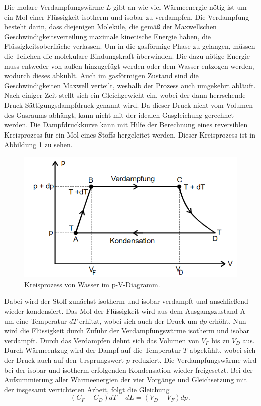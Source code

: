 Die molare Verdampfungswärme $L$ gibt an wie viel Wärmeenergie nötig ist um ein Mol einer Flüssigkeit isotherm und isobar zu verdampfen. 
Die Verdampfung besteht darin, dass diejenigen Moleküle, die gemäß der Maxwellschen Geschwindigkeitsverteilung maximale kinetische Energie haben, die Flüssigkeitsoberfläche verlassen.
Um in die gasförmige Phase zu gelangen, müssen die Teilchen die molekulare Bindungskraft überwinden. Die dazu nötige Energie muss entweder von außen hinzugefügt werden oder dem Wasser entzogen werden, wodurch dieses abkühlt.
Auch im gasförmigen Zustand sind die Geschwindigkeiten Maxwell verteilt, weshalb der Prozess auch umgekehrt abläuft. Nach einiger Zeit stellt sich ein Gleichgewicht ein, wobei der dann herrschende Druck 
Sättigungsdampfdruck genannt wird. Da dieser Druck nicht vom Volumen des Gasraums abhängt, kann nicht mit der idealen Gasgleichung gerechnet werden.
Die Dampfdruckkurve kann mit Hilfe der Berechnung eines reversiblen Kreisprozess für ein Mol eines Stoffs hergeleitet werden. Dieser Kreisprozess ist in Abbildung \ref{fig:kreis} zu sehen.
\begin{figure}
    \centering
    \caption{Kreisprozess von Wasser im p-V-Diagramm.\cite{v203}}
    \label{fig:kreis}
    \includegraphics[width = 0.6 \textwidth]{pics/kreis.png}
\end{figure}
Dabei wird der Stoff zunächst isotherm und isobar verdampft und anschließend wieder kondensiert. Das Mol der Flüssigkeit wird aus dem Ausgangszustand A um eine Temperatur
$dT$ erhitzt, wobei sich auch der Druck um $dp$ erhöht. Nun wird die Flüssigkeit durch Zufuhr der Verdampfungswärme isotherm und isobar verdampft. Durch das Verdampfen
dehnt sich das Volumen von $V_F$ bis zu $V_D$ aus. Durch Wärmeentzug wird der Dampf auf die Temperatur $T$ abgekühlt, wobei sich der Druck auch auf den Ursprungswert $p$ reduziert.
Die Verdampfungswärme wird bei der isobar und isotherm erfolgenden Kondensation wieder freigesetzt. Bei der Aufsummierung aller Wärmeenergien der vier Vorgänge und
Gleichsetzung mit der insgesamt verrichteten Arbeit, folgt die Gleichung 
\begin{equation}
    (C_F-C_D) dT + dL = (V_D-V_F)dp \, .
\end{equation}
